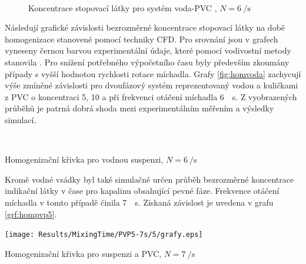 \begin{figure}[h!]
 \centering

  \qquad             
  \\
  \qquad
  \caption{Koncentrace stopovací látky pro systém voda-PVC , $N=\SI{6}{\per\second}$}
  \label{fig:t}
\end{figure}

Následují grafické závislosti bezrozměrné koncentrace stopovací látky na době homogenizace stanovené pomocí techniky CFD. Pro srovnání jsou v grafech vyneseny černou barvou experimentální údaje, které pomocí vodivostní metody stanovila \citet{pav11}. Pro snížení potřebného výpočetního času byly především zkoumány případy s vyšší hodnotou rychlosti rotace míchadla. Grafy \ref{fig:homvoda} zachycují výše zmíněné závislosti pro dvoufázový systém reprezentovaný vodou a kuličkami z PVC o koncentraci 5, 10 a  při frekvenci otáčení míchadla \SI{6}{\per\second}. Z vyobrazených průběhů je patrná dobrá shoda mezi experimentálním měřením a výsledky simulací.

\begin{grf}[h!]
 \centering
  \\ 
\end{grf}
\newpage

\begin{grf}[t!]
  \addtocounter{subgrf}{2}
  \centering
  \caption{Homogenizační křivka pro vodnou suspenzi, $N=\SI{6}{\per\second}$}
  \label{fig:homvoda}
\end{grf}
\noindent Kromě vodné vsádky byl také simulačně určen průběh bezrozměrné koncentrace indikační látky v čase pro kapalinu \pvpP{} obsahující  pevné fáze. Frekvence otáčení míchadla v tomto případě činila \SI{7}{\per\second}. Získaná závislost je uvedena v grafu \ref{grf:hompvp5}.
\begin{grf}[h!]
 \centering 
  \texttt{[image: Results/MixingTime/PVP5-7s/5/grafy.eps]}
  \caption{Homogenizační křivka pro suspenzi \pvpP{} a  PVC, $N=\SI{7}{\per\second}$}
  \label{grf:hompvp5}
\end{grf}
\newpage

